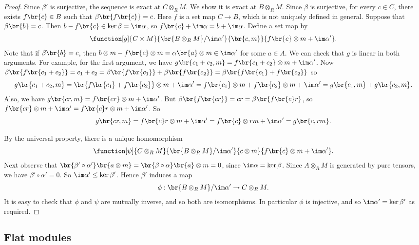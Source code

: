 \begin{proof}
Since $ \beta' $ is surjective, the sequence is exact at $ C \otimes_R M $. We show it is exact at $ B \otimes_R M $. Since $ \beta $ is surjective, for every $ c \in C $, there exists $ f\br{c} \in B $ such that $ \beta\br{f\br{c}} = c $. Here $ f $ is a set map $ C \to B $, which is not uniquely defined in general. Suppose that $ \beta\br{b} = c $. Then $ b - f\br{c} \in \ker \beta = \im \alpha $, so $ f\br{c} + \im \alpha = b + \im \alpha $. Define a set map by
$$ \function[g]{C \times M}{\br{B \otimes_R M} / \im \alpha'}{\br{c, m}}{f\br{c} \otimes m + \im \alpha'}. $$
Note that if $ \beta\br{b} = c $, then $ b \otimes m - f\br{c} \otimes m = \alpha\br{a} \otimes m \in \im \alpha' $ for some $ a \in A $. We can check that $ g $ is linear in both arguments. For example, for the first argument, we have $ g\br{c_1 + c_2, m} = f\br{c_1 + c_2} \otimes m + \im \alpha' $. Now $ \beta\br{f\br{c_1 + c_2}} = c_1 + c_2 = \beta\br{f\br{c_1}} + \beta\br{f\br{c_2}} = \beta\br{f\br{c_1} + f\br{c_2}} $ so
$$ g\br{c_1 + c_2, m} = \br{f\br{c_1} + f\br{c_2}} \otimes m + \im \alpha' = f\br{c_1} \otimes m + f\br{c_2} \otimes m + \im \alpha' = g\br{c_1, m} + g\br{c_2, m}. $$
Also, we have $ g\br{cr, m} = f\br{cr} \otimes m + \im \alpha' $. But $ \beta\br{f\br{cr}} = cr = \beta\br{f\br{c}r} $, so $ f\br{cr} \otimes m + \im \alpha' = f\br{c}r \otimes m + \im \alpha' $. So
$$ g\br{cr, m} = f\br{c}r \otimes m + \im \alpha' = f\br{c} \otimes rm + \im \alpha' = g\br{c, rm}. $$

\pagebreak

By the universal property, there is a unique homomorphism
$$ \function[\psi]{C \otimes_R M}{\br{B \otimes_R M} / \im \alpha'}{c \otimes m}{f\br{c} \otimes m + \im \alpha'}. $$
Next observe that $ \br{\beta' \circ \alpha'}\br{a \otimes m} = \br{\beta \circ \alpha}\br{a} \otimes m = 0 $, since $ \im \alpha = \ker \beta $. Since $ A \otimes_R M $ is generated by pure tensors, we have $ \beta' \circ \alpha' = 0 $. So $ \im \alpha' \le \ker \beta' $. Hence $ \beta' $ induces a map
$$ \phi : \br{B \otimes_R M} / \im \alpha' \to C \otimes_R M. $$
It is easy to check that $ \phi $ and $ \psi $ are mutually inverse, and so both are isomorphisms. In particular $ \phi $ is injective, and so $ \im \alpha' = \ker \beta' $ as required.
\end{proof}

\subsection{Flat modules}

